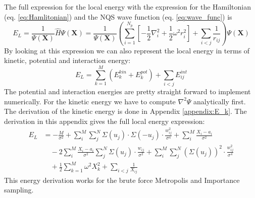 \documentclass[12pt,a4paper,english]{article}
\begin{document}
The full expression for the local energy with the expression for the Hamiltonian (eq. \ref{eq:Hamlitonian}) and the NQS wave function (eq. \ref{eq:wave_func}) is
\begin{equation}
\label{eq:full_EL}
E_L=\frac{1}{\Psi(\textbf{X})}\hat{H}\Psi(\textbf{X})= \frac{1}{\Psi(\textbf{X})}\left(\sum_{i=1}^{N_p}\left[-\frac{1}{2}\nabla^2_i + \frac{1}{2}\omega^2r_i^2\right] + \sum_{i<j}\frac{1}{r_{ij}}\right)\Psi(\textbf{X})
\end{equation}
By looking at this expression we can also represent the local energy in terms of kinetic, potential and interaction energy:
\begin{equation}
\label{eq:EL_kin_pot_int}
E_L=\sum_{k=1}^{M}(E_k^{kin}+E_k^{pot}) + \sum_{i<j}E_{ij}^{int}
\end{equation}
The potential and interaction energies are pretty straight forward to implement numerically. For the kinetic energy we have to compute $\nabla^2\Psi$ analytically first. The derivation of the kinetic energy is done in Appendix \ref{appendix:E_k}. The derivation in this appendix gives the full local energy expression:
\begin{align}
\label{eq:Full_energy}
E_L&= -\frac{M}{\sigma^2} +\sum_{i}^{M}\sum_{j}^{N}\Sigma(u_j)\cdot\Sigma(-u_j)\cdot\frac{w_{ij}^2}{\sigma^4} +\sum_{i}^{M}\frac{X_i-a_i}{\sigma^2}\nonumber\\ 
&\quad -2\sum_{i}^{M}\frac{X_i-a_i}{\sigma^2}\sum_{j}^{N}\Sigma(u_j)\cdot\frac{w_{ij}}{\sigma^2} 
+\sum_{i}^{M}\sum_{j}^{N}(\Sigma(u_j))^2\cdot\frac{w_{ij}^2}{\sigma^4}\nonumber\\
&\quad +\frac{1}{2}\sum_{k=1}^{M}\omega^2X_k^2 + \sum_{i<j}\frac{1}{X_{ij}}
\end{align}
This energy derivation works for the brute force Metropolis and Importance sampling.
\end{document}
